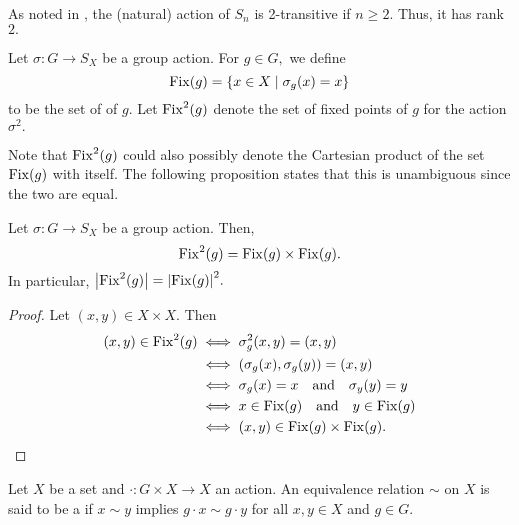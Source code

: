 \begin{ex}[Rank of $S_n$]
	As noted in , the (natural) action of $S_n$ is 2-transitive if $n \ge 2.$ Thus, it has rank $2.$
\end{ex}

\begin{defn}
	Let $\sigma : G \to S_X$ be a group action. For $g \in G,$ we define
	\begin{equation*} 
		\operatorname{Fix}(g) = \{x \in X \mid \sigma_g(x) = x\}
	\end{equation*}
	to be the set of  of $g.$ Let $\operatorname{Fix}^2(g)$ denote the set of fixed points of $g$ for the action $\sigma^2.$
\end{defn}

Note that $\operatorname{Fix}^2(g)$ could also possibly denote the Cartesian product of the set $\operatorname{Fix}(g)$ with itself. The following proposition states that this is unambiguous since the two are equal.

\begin{prop} \label{prop:fix2isfix2}
	Let $\sigma : G \to S_X$ be a group action. Then,
	\begin{equation*} 
		\operatorname{Fix}^2(g) = \operatorname{Fix}(g) \times \operatorname{Fix}(g).
	\end{equation*}
	In particular, ${\left\lvert \operatorname{Fix}^2(g) \right\lvert} = {\left\lvert \operatorname{Fix}(g) \right\lvert}^2.$
\end{prop}

\begin{proof} 
	Let $(x, y) \in X \times X.$ Then
	\begin{align*} 
		(x, y) \in \operatorname{Fix}^2(g) &\iff \sigma^2_g(x, y) = (x, y)\\
		& \iff (\sigma_g(x), \sigma_g(y)) = (x, y)\\
		& \iff \sigma_g(x) = x \quad\text{and}\quad \sigma_y(y) = y\\
		& \iff x \in \operatorname{Fix}(g) \quad\text{and}\quad y \in \operatorname{Fix}(g)\\
		& \iff (x, y) \in \operatorname{Fix}(g) \times \operatorname{Fix}(g). \qedhere
	\end{align*}
\end{proof}

\begin{defn}%
	\label{defn:leftcongruence}
	Let $X$ be a set and $\cdot : G \times X \to X$ an action. An equivalence relation $\sim$ on $X$ is said to be a  if $x \sim y$ implies $g \cdot x \sim g \cdot y$ for all $x, y \in X$ and $g \in G.$
\end{defn}

